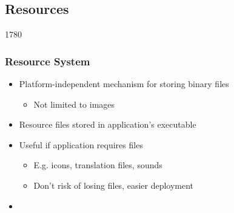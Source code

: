 %
%
%
%

\subsection{Resources}

\begin{slide}{1780}\frametitle{Resource System}
   \begin{itemize}
    \item Platform-independent mechanism for storing binary files
      \begin{itemize}
      \item Not limited to images
      \end{itemize}
    \item Resource files stored in application's executable
    \item Useful if application requires files 
      \begin{itemize}
      \item E.g. icons, translation files, sounds
      \item  Don't risk of losing files, easier deployment
      \end{itemize}

      \item[] 
    \end{itemize}
\end{slide}
